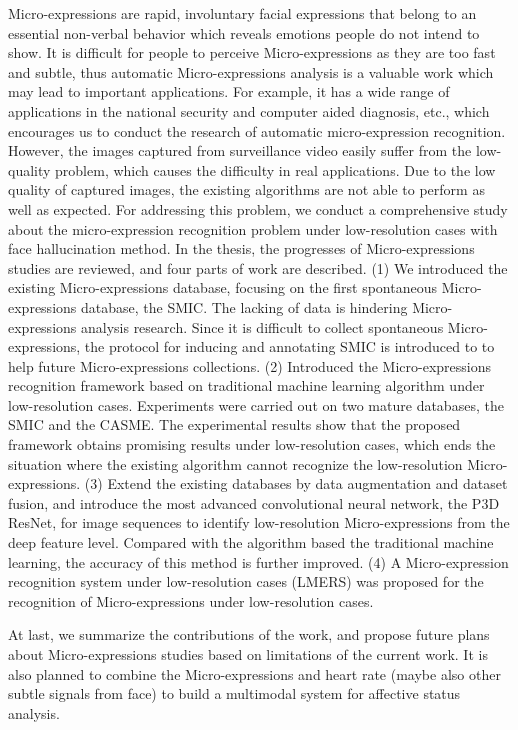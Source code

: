 Micro-expressions are rapid, involuntary facial expressions that belong to an essential non-verbal behavior which reveals emotions people do not intend to show. It is difficult for people to perceive Micro-expressions as they are too fast and subtle, thus automatic Micro-expressions analysis is a valuable work which may lead to important applications. For example, it has a wide range of applications in the national security and computer aided diagnosis, etc., which encourages us to conduct the research of automatic micro-expression recognition. However, the images captured from surveillance video easily suffer from the low-quality problem, which causes the difficulty in real applications. Due to the low quality of captured images, the existing algorithms are not able to perform as well as expected. For addressing this problem, we conduct a comprehensive study about the micro-expression recognition problem under low-resolution cases with face hallucination method. In the thesis, the progresses of Micro-expressions studies are reviewed, and four parts of work are described. (1) We introduced the existing Micro-expressions database, focusing on the first spontaneous Micro-expressions database, the SMIC. The lacking of data is hindering Micro-expressions analysis research. Since it is difficult to collect spontaneous Micro-expressions, the protocol for inducing and annotating SMIC is introduced to to help future Micro-expressions collections. (2) Introduced the Micro-expressions recognition framework based on traditional machine learning algorithm under low-resolution cases. Experiments were carried out on two mature databases, the SMIC and the CASME. The experimental results show that the proposed framework obtains promising results under low-resolution cases, which ends the situation where the existing algorithm cannot recognize the low-resolution Micro-expressions. (3) Extend the existing databases by data augmentation and dataset fusion, and introduce the most advanced convolutional neural network, the P3D ResNet, for image sequences to identify low-resolution Micro-expressions from the deep feature level. Compared with the algorithm based the traditional machine learning, the accuracy of this method is further improved. (4) A Micro-expression recognition system under low-resolution cases (LMERS) was proposed for the recognition of Micro-expressions under low-resolution cases.

At last, we summarize the contributions of the work, and propose future plans about Micro-expressions studies based on limitations of the current work. It is also planned to combine the Micro-expressions and heart rate (maybe also other subtle signals from face) to build a multimodal system for affective status analysis.

